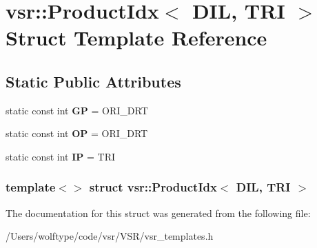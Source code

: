 \hypertarget{structvsr_1_1_product_idx_3_01_d_i_l_00_01_t_r_i_01_4}{\section{vsr\-:\-:Product\-Idx$<$ D\-I\-L, T\-R\-I $>$ Struct Template Reference}
\label{structvsr_1_1_product_idx_3_01_d_i_l_00_01_t_r_i_01_4}
}
\subsection*{Static Public Attributes}
\begin{DoxyCompactItemize}
\item 
\hypertarget{structvsr_1_1_product_idx_3_01_d_i_l_00_01_t_r_i_01_4_a42865c242a448d90331c56df598d4aab}{static const int {\bfseries G\-P} = O\-R\-I\-\_\-\-D\-R\-T}\label{structvsr_1_1_product_idx_3_01_d_i_l_00_01_t_r_i_01_4_a42865c242a448d90331c56df598d4aab}

\item 
\hypertarget{structvsr_1_1_product_idx_3_01_d_i_l_00_01_t_r_i_01_4_a3cc6ac3e681b62cb3a2be15f1bb94749}{static const int {\bfseries O\-P} = O\-R\-I\-\_\-\-D\-R\-T}\label{structvsr_1_1_product_idx_3_01_d_i_l_00_01_t_r_i_01_4_a3cc6ac3e681b62cb3a2be15f1bb94749}

\item 
\hypertarget{structvsr_1_1_product_idx_3_01_d_i_l_00_01_t_r_i_01_4_a801ab7da9836dd566097e5e5e4164c27}{static const int {\bfseries I\-P} = T\-R\-I}\label{structvsr_1_1_product_idx_3_01_d_i_l_00_01_t_r_i_01_4_a801ab7da9836dd566097e5e5e4164c27}

\end{DoxyCompactItemize}
\subsubsection*{template$<$$>$ struct vsr\-::\-Product\-Idx$<$ D\-I\-L, T\-R\-I $>$}



The documentation for this struct was generated from the following file\-:\begin{DoxyCompactItemize}
\item 
/\-Users/wolftype/code/vsr/\-V\-S\-R/vsr\-\_\-templates.\-h\end{DoxyCompactItemize}
